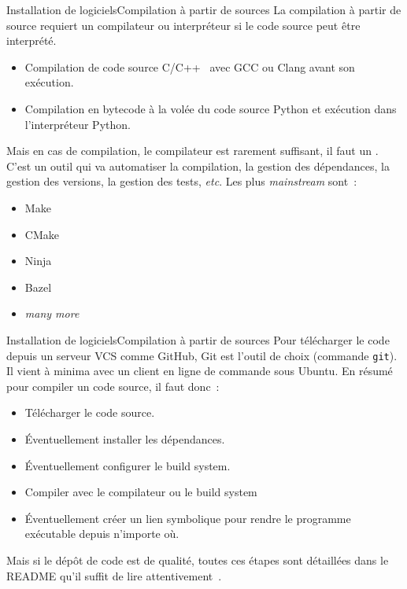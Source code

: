 \documentclass{beamer}
\begin{document}
    \begin{frame}{Installation de logiciels}{Compilation à partir de sources}
        La compilation à partir de source requiert un compilateur ou interpréteur si le code source peut être interprété.
        \bigbreak
        \begin{itemize}
            \item Compilation de code source C/C++~ avec GCC ou Clang avant son exécution.
            \item Compilation en bytecode à la volée du code source Python et exécution dans l'interpréteur Python.
        \end{itemize}
        Mais en cas de compilation, le compilateur est rarement suffisant, il faut un .
        C'est un outil qui va automatiser la compilation, la gestion des dépendances, la gestion des versions, la gestion des tests, \textit{etc}.
        Les plus \textit{mainstream} sont~:
        \begin{itemize}
            \item Make
            \item CMake
            \item Ninja
            \item Bazel
            \item \textit{many more}
        \end{itemize}
    \end{frame}

    \begin{frame}{Installation de logiciels}{Compilation à partir de sources}
        Pour télécharger le code depuis un serveur VCS comme GitHub, Git est l'outil de choix (commande \lstinline{git}).
        Il vient à minima avec un client en ligne de commande sous Ubuntu.
        \bigbreak
        En résumé pour compiler un code source, il faut donc~:
        \begin{itemize}
            \item Télécharger le code source.
            \item Éventuellement installer les dépendances.
            \item Éventuellement configurer le build system.
            \item Compiler avec le compilateur ou le build system
            \item Éventuellement créer un lien symbolique pour rendre le programme exécutable depuis n'importe où.
        \end{itemize}
        Mais si le dépôt de code est de qualité, toutes ces étapes sont détaillées dans le README qu'il suffit de lire attentivement~.
    \end{frame}
\end{document}
